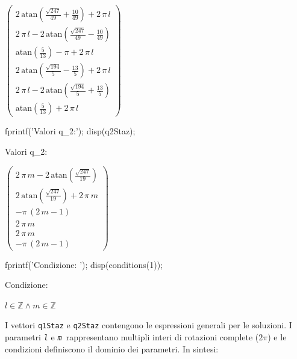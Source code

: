 \documentclass[11pt, a4paper]{article}
\begin{document}
\begin{matlabsymbolicoutput}
$\displaystyle \left(\begin{array}{c}
2\,\textrm{atan}\left(\frac{\sqrt{247}}{49}+\frac{10}{49}\right)+2\,\pi \,l\\
2\,\pi \,l-2\,\textrm{atan}\left(\frac{\sqrt{247}}{49}-\frac{10}{49}\right)\\
\textrm{atan}\left(\frac{5}{13}\right)-\pi +2\,\pi \,l\\
2\,\textrm{atan}\left(\frac{\sqrt{194}}{5}-\frac{13}{5}\right)+2\,\pi \,l\\
2\,\pi \,l-2\,\textrm{atan}\left(\frac{\sqrt{194}}{5}+\frac{13}{5}\right)\\
\textrm{atan}\left(\frac{5}{13}\right)+2\,\pi \,l
\end{array}\right)$
\end{matlabsymbolicoutput}
\begin{matlabcode}
fprintf('Valori q_2:');
disp(q2Staz);
\end{matlabcode}
\begin{matlaboutput}
Valori q_2:
\end{matlaboutput}
\begin{matlabsymbolicoutput}
$\displaystyle \left(\begin{array}{c}
2\,\pi \,m-2\,\textrm{atan}\left(\frac{\sqrt{247}}{19}\right)\\
2\,\textrm{atan}\left(\frac{\sqrt{247}}{19}\right)+2\,\pi \,m\\
-\pi \,{\left(2\,m-1\right)}\\
2\,\pi \,m\\
2\,\pi \,m\\
-\pi \,{\left(2\,m-1\right)}
\end{array}\right)$
\end{matlabsymbolicoutput}
\newpage
\begin{matlabcode}
fprintf('Condizione: ');
disp(conditions(1));
\end{matlabcode}
\begin{matlaboutput}
Condizione:
\end{matlaboutput}
\begin{matlabsymbolicoutput}
$\displaystyle l\in \mathbb{Z}\wedge m\in \mathbb{Z}$
\end{matlabsymbolicoutput}

\begin{par}
\begin{flushleft}
I vettori \texttt{q1Staz} e \texttt{q2Staz} contengono le espressioni generali per le soluzioni. I parametri \texttt{\textit{l}}\textit{ }e\textit{ }\texttt{\textit{m }}rappresentano multipli interi di rotazioni complete ($2\pi$) e le condizioni definiscono il dominio dei parametri. In sintesi:
\end{flushleft}
\end{par}
\end{document}

